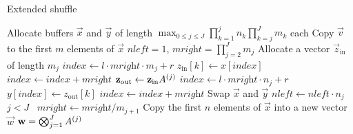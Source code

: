 \begin{algorithm}
  \caption{Extended shuffle
    \citep[Algorithm~2.1]{DBLP:conf/ipps/BenoitPS03}}
  \label{alg:kronecker:shuffle}
  \begin{algorithmic}[1]
    \State Allocate buffers $\vec{x}$ and $\vec{y}$ of length $\max_{0
    \le j \le J} \prod_{k = 1}^j n_k \prod_{k = j}^J m_k$ each
    \State Copy $\vec{v}$ to the first $m$ elements of $\vec{x}$
    \State $\textit{nleft} = 1$, $\textit{mright} = \prod_{j = 2}^J m_j$
    \State Allocate a vector $\vec{z}_{\textrm{in}}$ of length $m_j$
    \State $\textit{index} \gets l \cdot \textit{mright} \cdot m_j + r$
    \State $z_{\textrm{in}}[k] \gets x[\textit{index}]$
    \State $\textit{index} \gets \textit{index} + \textit{mright}$
    \EndFor
    \State $\boldsymbol{\mathrm{z}}_{\textrm{out}} \gets \boldsymbol{\mathrm{z}}_{\textrm{in}}
    A^{(j)}$
    \State $\textit{index} \gets l \cdot \textit{mright} \cdot n_j +
    r$
    \State $y[\textit{index}] \gets z_{\textrm{out}}[k]$
    \State $\textit{index} \gets \textit{index} + \textit{mright}$
    \EndFor
    \EndFor
    \EndFor
    \State Swap $\vec{x}$ and $\vec{y}$
    \State $\textit{nleft} \gets \textit{nleft} \cdot n_j$
    \State \algorithmicif\ $j < J$ \algorithmicthen\
    $\textit{mright} \gets \textit{mright} / m_{j + 1}$
    \EndFor
    \State Copy the first $n$ elements of $\vec{x}$ into a new vector
    $\vec{w}$
    \State \Return $\boldsymbol{\mathrm{w}} = \bigotimes_{j = 1}^J A^{(j)}$
    \EndFunction
  \end{algorithmic}
\end{algorithm}

